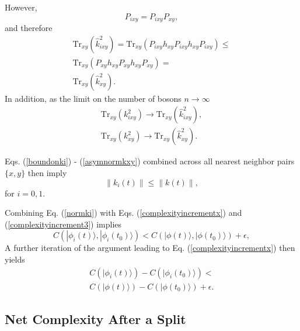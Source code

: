 \documentclass[12pt,amsmath,amssymb,onecolumn]{revtex4-2}
\begin{document}
However,
\begin{equation}
  \label{ppi}
  P_{ixy} = P_{ixy} P_{xy},
  \end{equation}
and therefore
\begin{multline}
  \label{boundonki}
  \mathrm{Tr}_{xy}( \hat{k}_{ixy}^2) = \mathrm{Tr}_{xy}( P_{ixy} h_{xy} P_{ixy} h_{xy}P_{ixy}) \le \\
  \mathrm{Tr}_{xy} (P_{xy} h_{xy} P_{xy} h_{xy} P_{xy}) = \\
  \mathrm{Tr}_{xy}( \hat{k}_{xy}^2).
\end{multline}
In addition, as the limit on the number of bosons $n \rightarrow \infty$ 
\begin{subequations}
\begin{eqnarray}
  \label{asymnormkixy}
  \mathrm{Tr}_{xy}(k_{ixy}^2) \rightarrow \mathrm{Tr}_{xy}(\hat{k}_{ixy}^2), \\
  \label{asymnormkxy}
  \mathrm{Tr}_{xy}(k_{xy}^2) \rightarrow \mathrm{Tr}_{xy}(\hat{k}_{xy}^2).
\end{eqnarray}
\end{subequations}

Eqs. (\ref{boundonki}) - (\ref{asymnormkxy})  combined across all nearest neighbor pairs $\{x, y\}$ then imply
\begin{equation}
  \label{normki}
  \parallel k_i(t) \parallel \le \parallel k(t) \parallel,
\end{equation}
for $i = 0, 1$.


Combining Eq. (\ref{normki}) with Eqs. (\ref{complexityincrementx}) and (\ref{complexityincrement3})
implies 
\begin{equation}
  \label{complexityincrementbound}
  C( |\phi_i(t) \rangle , |\phi_i(t_0) \rangle ) < C( |\phi(t) \rangle , |\phi(t_0) \rangle ) + \epsilon,
\end{equation}
A further iteration of the argument leading to Eq. (\ref{complexityincrementx})
then yields
\begin{multline}
  \label{complexityincrementbound1}
  C( |\phi_i(t) \rangle ) - C(|\phi_i(t_0) \rangle ) < \\
  C( |\phi(t) \rangle ) - C(|\phi(t_0) \rangle ) + \epsilon.
\end{multline}



\subsection{\label{subsec:after1} Net Complexity After a Split}
\end{document}

